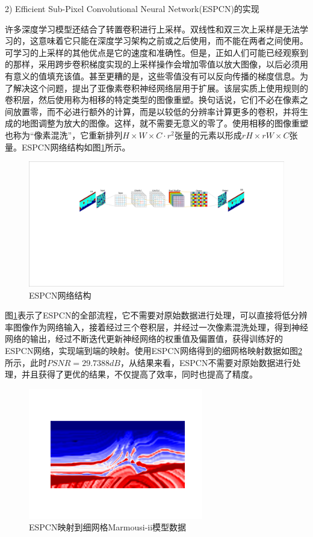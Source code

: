 \documentclass[11pt]{article}
\begin{document}
\par
2) Efficient Sub-Pixel Convolutional Neural Network(ESPCN)的实现
\par
许多深度学习模型还结合了转置卷积进行上采样。双线性和双三次上采样是无法学习的，这意味着它只能在深度学习架构之前或之后使用，而不能在两者之间使用。可学习的上采样的其他优点是它的速度和准确性。但是，正如人们可能已经观察到的那样，采用跨步卷积梯度实现的上采样操作会增加零值以放大图像，以后必须用有意义的值填充该值。甚至更糟的是，这些零值没有可以反向传播的梯度信息。为了解决这个问题，提出了亚像素卷积神经网络层用于扩展。该层实质上使用规则的卷积层，然后使用称为相移的特定类型的图像重塑。换句话说，它们不必在像素之间放置零，而不必进行额外的计算，而是以较低的分辨率计算更多的卷积，并将生成的地图调整为放大的图像。这样，就不需要无意义的零了。使用相移的图像重塑也称为``像素混洗''，它重新排列$H \times W \times C \cdot r^2$张量的元素以形成$rH \times rW \times C$张量。ESPCN网络结构如图\ref{Fig_ESPCN}所示。
\begin{figure}[htbp]
\centering
\includegraphics[width=5.5in]{./FigureFolder/Foundation/SuperResolution/ESPCN/ESPCN.pdf}
\caption{ESPCN网络结构}
\label{Fig_ESPCN}
\end{figure}
\par
图\ref{Fig_ESPCN}表示了ESPCN的全部流程，它不需要对原始数据进行处理，可以直接将低分辨率图像作为网络输入，接着经过三个卷积层，并经过一次像素混洗处理，得到神经网络的输出，经过不断迭代更新神经网络的权重值及偏置值，获得训练好的ESPCN网络，实现端到端的映射。使用ESPCN网络得到的细网格映射数据如图\ref{Fig_HRESPCN}所示，此时$PSNR=29.7388dB$，从结果来看，ESPCN不需要对原始数据进行处理，并且获得了更优的结果，不仅提高了效率，同时也提高了精度。
\begin{figure}[htbp]
\centering
\includegraphics[width=3in]{./FigureFolder/Foundation/SuperResolution/ESPCN/HR_Marmousi.pdf}
\caption{ESPCN映射到细网格Marmousi-ii模型数据}
\label{Fig_HRESPCN}
\end{figure}
\end{document}
